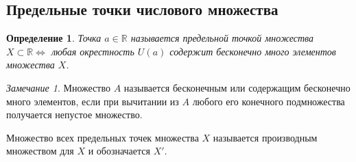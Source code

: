 \documentclass[a4paper,12pt]{article} %
\newtheorem{definition}{Определение}[section]
\theoremstyle{remark}
\newtheorem{remark}{Замечание}[theorem]
\theoremstyle{definition}
\begin{document}
\subsection{Предельные точки числового множества}
\begin{definition}
	Точка $a\in \mathbb{R}$ называется предельной точкой множества $X\subset \mathbb{R} \iff$ любая окрестность $U(a)$ содержит бесконечно много элементов множества $X$.
\end{definition}
\begin{remark}
	Множество $A$ называется бесконечным или содержащим бесконечно много элементов, если при вычитании из $A$ любого его конечного подмножества получается непустое множество.
\end{remark}

Множество всех предельных точек множества $X$ называется производным множеством для $X$ и обозначается $X'$.
\end{document}

